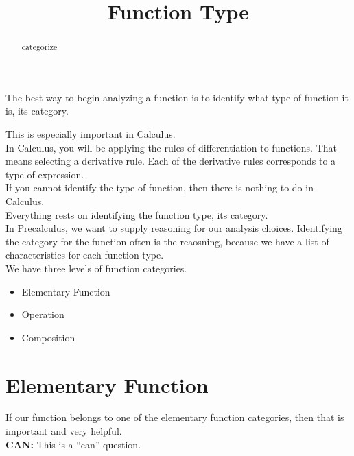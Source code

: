 \documentclass{ximera}
\title{Function Type}
\begin{document}
\begin{abstract}
categorize
\end{abstract}
\maketitle








The best way to begin analyzing a function is to identify what type of function it is, its category.

This is especially important in Calculus.   \\


In Calculus, you will be applying the rules of differentiation to functions. That means selecting a derivative rule.  Each of the derivative rules corresponds to a type of expression. \\

If you cannot identify the type of function, then there is nothing to do in Calculus. \\

Everything rests on identifying the function type, its category. \\



In Precalculus, we want to supply reasoning for our analysis choices.  Identifying the category for the function often is the reaosning, because we have a list of characteristics for each function type. \\



We have three levels of function categories.

\begin{itemize}
    \item Elementary Function
    \item Operation
    \item Composition
\end{itemize} 



\section{Elementary Function}

If our function belongs to one of the elementary function categories, then that is important and very helpful. \\


\textbf{\textcolor{purple!85!blue}{CAN:}}   This is a ``can'' question. \\
\end{document}
